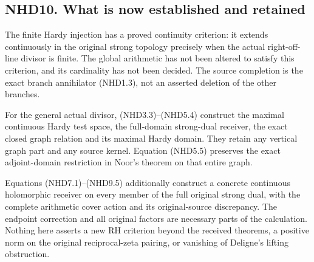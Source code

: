 \subsection{NHD10. What is now established and
retained}\label{nhd10.-what-is-now-established-and-retained}

The finite Hardy injection has a proved continuity criterion: it extends
continuously in the original strong topology precisely when the actual
right-off-line divisor is finite. The global arithmetic has not been
altered to satisfy this criterion, and its cardinality has not been
decided. The source completion is the exact branch annihilator (NHD1.3),
not an asserted deletion of the other branches.

For the general actual divisor, (NHD3.3)--(NHD5.4) construct the maximal
continuous Hardy test space, the full-domain strong-dual receiver, the
exact closed graph relation and its maximal Hardy domain. They retain
any vertical graph part and any source kernel. Equation (NHD5.5)
preserves the exact adjoint-domain restriction in Noor's theorem on that
entire graph.

Equations (NHD7.1)--(NHD9.5) additionally construct a concrete
continuous holomorphic receiver on every member of the full original
strong dual, with the complete arithmetic cover action and its
original-source discrepancy. The endpoint correction and all original
factors are necessary parts of the calculation. Nothing here asserts a
new RH criterion beyond the received theorems, a positive norm on the
original reciprocal-zeta pairing, or vanishing of Deligne's lifting
obstruction.
